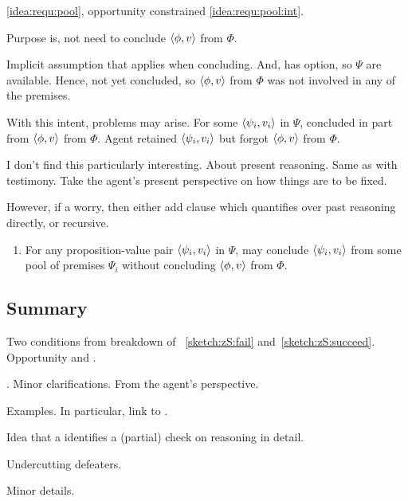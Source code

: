 \begin{note}
  \ref{idea:requ:pool}, opportunity constrained \ref{idea:requ:pool:int}.

  Purpose is, not need to conclude \(\langle \phi, v \rangle\) from \(\Phi\).

  Implicit assumption that \requ{} applies when concluding.
  And, has option, so \(\Psi\) are available.
  Hence, not yet concluded, so \(\langle \phi, v \rangle\) from \(\Phi\) was not involved in any of the premises.

  With this intent, problems may arise.
  For some \(\langle \psi_{i}, v_{i} \rangle\) in \(\Psi\), concluded in part from \(\langle \phi, v \rangle\) from \(\Phi\).
  Agent retained \(\langle \psi_{i}, v_{i} \rangle\) but forgot \(\langle \phi, v \rangle\) from \(\Phi\).

  I don't find this particularly interesting.
  About present reasoning.
  Same as with testimony.
  Take the agent's present perspective on how things are to be fixed.

  However, if a worry, then either add clause which quantifies over past reasoning directly, or recursive.

  \begin{enumerate}
  \item
    \label{idea:requ:pool:ind}
    For any proposition-value pair \(\langle \psi_{i}, v_{i} \rangle\) in \(\Psi\), \vAgent{} may conclude \(\langle \psi_{i}, v_{i} \rangle\) from some pool of premises \(\Psi_{i}\) without concluding \(\langle \phi, v \rangle\) from \(\Phi\).
  \end{enumerate}
\end{note}

\subsection{Summary}
\label{cha:zS:sec:requs:summary}

\begin{note}
  Two conditions from breakdown of ~\ref{sketch:zS:fail} and~\ref{sketch:zS:succeed}.
  Opportunity and \check{}.

  \requ{}.
  Minor clarifications.
  From the agent's perspective.

  Examples.
  In particular, link to .

  Idea that a \requ{} identifies a (partial) check on reasoning in detail.

  Undercutting defeaters.

  Minor details.
\end{note}

